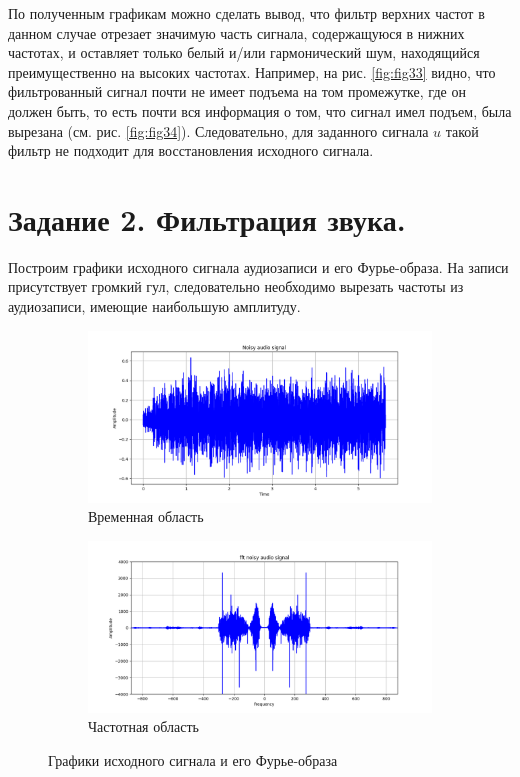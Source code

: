 \documentclass[a4paper, 12pt]{article}
\begin{document}
    
    По полученным графикам можно сделать вывод, что фильтр верхних частот в данном случае отрезает значимую часть сигнала,
    содержащуюся в нижних частотах, и оставляет только белый и/или гармонический шум, находящийся преимущественно на высоких частотах.
    Например, на рис. \ref{fig:fig33} видно, что фильтрованный сигнал почти не имеет подъема на том промежутке, где он должен быть, то есть
    почти вся информация о том, что сигнал имел подъем, была вырезана (см. рис. \ref{fig:fig34}).
    Следовательно, для заданного сигнала $u$ такой фильтр не
    подходит для восстановления исходного сигнала.


    \section{Задание 2. Фильтрация звука.}
    Построим графики исходного сигнала аудиозаписи и его Фурье-образа.
    На записи присутствует громкий гул, следовательно необходимо вырезать частоты из аудиозаписи, имеющие наибольшую амплитуду.
    \begin{figure}[H]
        \centering
        \begin{subfigure}{0.45\textwidth}
            \centering
            \includegraphics[width=\linewidth]{audio.png}
            \caption{Временная область}
            \label{fig:fig111}
        \end{subfigure}
        \hspace{5mm}
        \begin{subfigure}{0.45\textwidth}
            \centering
            \includegraphics[width=\linewidth]{U_audio.png}
            \caption{Частотная область}
            \label{fig:fig112}
        \end{subfigure}
        \caption{Графики исходного сигнала и его Фурье-образа}
        \label{fig:timefreq0}
    \end{figure}
    
\end{document}

